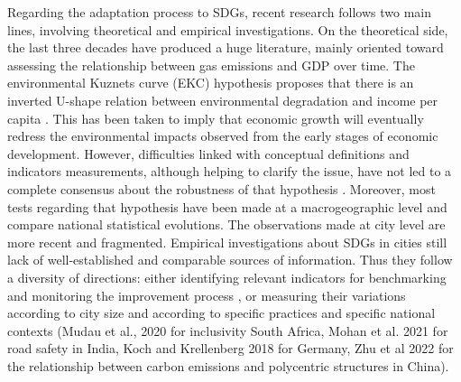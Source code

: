 \documentclass[final,5p,times,twocolumn,authoryear]{elsarticle}
\begin{document}
Regarding the adaptation process to SDGs, recent research follows two main lines, involving theoretical and empirical investigations.  On the theoretical side, the last three decades have produced a huge literature, mainly oriented toward assessing the relationship between gas emissions and GDP over time. The environmental Kuznets curve (EKC) hypothesis proposes that there is an inverted U-shape relation between environmental degradation and income per capita \citep{dinda2004environmental, stern2004rise}. This has been taken to imply that economic growth will eventually redress the environmental impacts observed from the early stages of economic development. However, difficulties linked with conceptual definitions and indicators measurements, although helping to clarify the issue, have not led to a complete consensus about the robustness of that hypothesis \citep{harbaugh2002reexamining}. Moreover, most tests regarding that hypothesis have been made at a macrogeographic level and compare national statistical evolutions. The observations made at city level are more recent and fragmented. Empirical investigations about SDGs in cities still lack of well-established and comparable sources of information. Thus they follow a diversity of directions: either identifying relevant indicators for benchmarking and monitoring the improvement process \citep{giles2020achieving}, or measuring their variations according to city size \citep{laituri2021sdg} and according to specific practices and specific national contexts (Mudau et al., 2020 for inclusivity South Africa, Mohan et al. 2021 for road safety in India, Koch and Krellenberg 2018 for Germany, Zhu et al 2022 for the relationship between carbon emissions and polycentric structures in China). 
\end{document}
